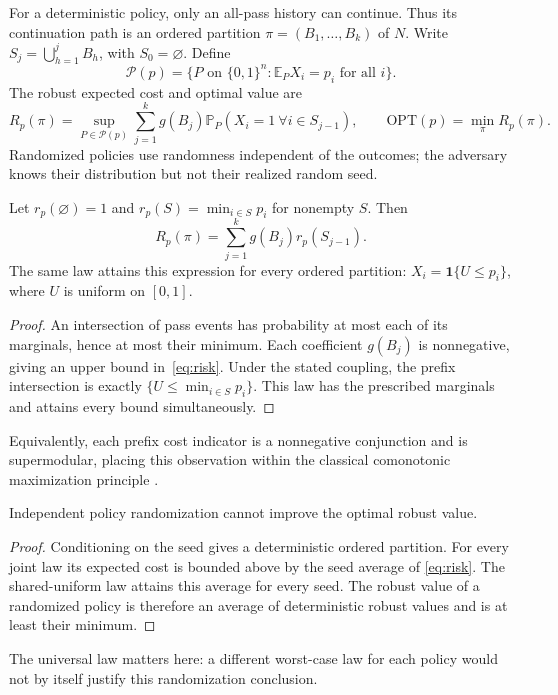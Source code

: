 \documentclass[runningheads]{llncs}
\newcommand{\E}{\mathbb{E}}
\newcommand{\Prb}{\mathbb{P}}
\newcommand{\calP}{\mathcal{P}}
\newcommand{\OPT}{\mathrm{OPT}}
\begin{document}
For a deterministic policy, only an all-pass history can continue. Thus its
continuation path is an ordered partition
$\pi=(B_1,\ldots,B_k)$ of $N$. Write
$S_j=\bigcup_{h=1}^jB_h$, with $S_0=\varnothing$. Define
\[
\calP(p)=\{P\text{ on }\{0,1\}^n:\E_P X_i=p_i\text{ for all }i\}.
\]
The robust expected cost and optimal value are
\begin{equation}
R_p(\pi)=\sup_{P\in\calP(p)}
 \sum_{j=1}^k g(B_j)\Prb_P(X_i=1\ \forall i\in S_{j-1}),
\qquad \OPT(p)=\min_\pi R_p(\pi).
\label{eq:model}
\end{equation}
Randomized policies use randomness independent of the outcomes; the adversary
knows their distribution but not their realized random seed.

\begin{proposition}\label{prop:coupling}
Let $r_p(\varnothing)=1$ and
$r_p(S)=\min_{i\in S}p_i$ for nonempty $S$. Then
\begin{equation}
R_p(\pi)=\sum_{j=1}^k g(B_j)r_p(S_{j-1}).
\label{eq:risk}
\end{equation}
The same law attains this expression for every ordered partition:
$X_i=\mathbf{1}\{U\leq p_i\}$, where $U$ is uniform on $[0,1]$.
\end{proposition}
\begin{proof}
An intersection of pass events has probability at most each of its marginals,
hence at most their minimum. Each coefficient $g(B_j)$ is nonnegative, giving
an upper bound in~\eqref{eq:risk}. Under the stated coupling, the prefix
intersection is exactly $\{U\leq\min_{i\in S}p_i\}$. This law has the prescribed
marginals and attains every bound simultaneously.
\end{proof}
Equivalently, each prefix cost indicator is a nonnegative conjunction and
is supermodular, placing this observation within the classical comonotonic
maximization principle \cite{agrawal2012}.

\begin{corollary}\label{cor:random}
Independent policy randomization cannot improve the optimal robust value.
\end{corollary}
\begin{proof}
Conditioning on the seed gives a deterministic ordered partition. For every
joint law its expected cost is bounded above by the seed average of
\eqref{eq:risk}. The shared-uniform law attains this average for every seed.
The robust value of a randomized policy is therefore an average of
deterministic robust values and is at least their minimum.
\end{proof}
The universal law matters here: a different worst-case law for each policy
would not by itself justify this randomization conclusion.
\end{document}
